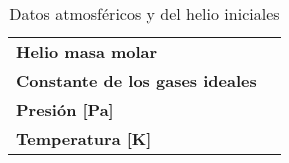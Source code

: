 \begin{table}[h]
\centering
\begin{tabular}{ll}
\textbf{Helio masa molar}               &  \\
\textbf{Constante de los gases ideales} &  \\
\textbf{Presión  [Pa]  }                     &  \\
\textbf{Temperatura [K] }                  & 
\end{tabular}
\caption{Datos atmosféricos y del helio iniciales}
\label{tab:iniciales_helio}
\end{table}